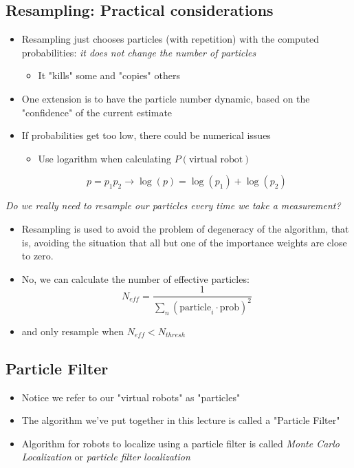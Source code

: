 \documentclass[10pt]{article}
\begin{document}
\subsection*{Resampling: Practical considerations}
\begin{itemize}
	\item Resampling just chooses particles (with repetition) with the computed probabilities: \textit{it does not change the number of particles}
	\begin{itemize}
        \item It "kills" some and "copies" others
    \end{itemize}
    \item One extension is to have the particle number dynamic, based on the "confidence" of the current estimate
    \item If probabilities get too low, there could be numerical issues
    \begin{itemize}
        \item Use logarithm when calculating $P(\text{virtual robot})$
    \end{itemize}
    \[p = p_1 p_2 \rightarrow \log(p) = \log(p_1) + \log(p_2)\]
\end{itemize}
\textit{Do we really need to resample our particles every time we take a measurement?}
\begin{itemize}
	\item Resampling is used to avoid the problem of degeneracy of the algorithm, that is, avoiding the situation that all but one of the importance weights are close to zero.
	\item No, we can calculate the number of effective particles:
	\[N_{eff} = \frac{1}{\sum_n (\text{particle}_i \cdot \text{prob})^2}\]
    \item and only resample when $N_{eff} < N_{thresh}$
\end{itemize}

\subsection*{Particle Filter}
\begin{itemize}
	\item Notice we refer to our "virtual robots" as "particles"
	\item The algorithm we've put together in this lecture is called a "Particle Filter"
	\item Algorithm for robots to localize using a particle filter is called \textit{Monte Carlo Localization} or \textit{particle filter localization}
\end{itemize}
\end{document}
